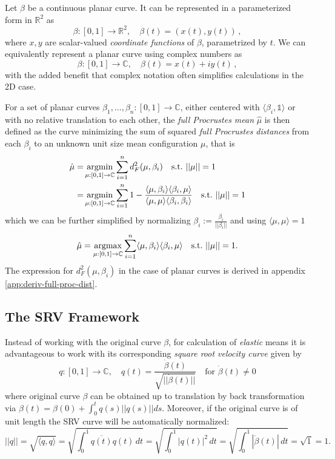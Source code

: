 Let $\beta$ be a continuous planar curve.
It can be represented in a parameterized form in $\mathbb{R}^2$ as
$$ \beta : [0,1] \rightarrow \mathbb{R}^2,\quad \beta(t) = ( x(t), y(t)) \,, $$
where $x, y$ are scalar-valued \textit{coordinate functions} of $\beta$, parametrized by $t$.
We can equivalently represent a planar curve using complex numbers as
$$ \beta : [0,1] \rightarrow \mathbb{C},\quad \beta(t) = x(t) + iy(t) \,, $$
with the added benefit that complex notation often simplifies calculations in the 2D case.

For a set of planar curves $\beta_1,\dots,\beta_n : [0,1] \rightarrow \mathbb{C}$, either centered with $\langle \beta_i, \mathbb{1} \rangle$ or with no relative translation to each other, the \textit{full Procrustes mean} $\hat{\mu}$ is then defined as the curve minimizing the sum of squared \textit{full Procrustes distances} from each $\beta_i$ to an unknown unit size mean configuration $\mu$, that is
\begin{align*}
    \hat{\mu} =& \operatorname*{argmin}_{\mu:[0,1]\rightarrow\mathbb{C}} \sum_{i=1}^n d^2_F(\mu,\beta_i)
    \quad\text{s.t.}\,\, ||\mu|| = 1 \\
    =& \operatorname*{argmin}_{\mu:[0,1]\rightarrow\mathbb{C}} \sum_{i=1}^n 1 - \frac{\langle \mu, \beta_i \rangle \langle \beta_i, \mu \rangle}{\langle \mu, \mu \rangle \langle \beta_i, \beta_i \rangle}
    \quad\text{s.t.}\,\, ||\mu|| = 1
\end{align*}
which we can be further simplified by normalizing $\beta_i := \frac{\beta_i}{|| \beta_i ||}$ and using $\langle \mu, \mu \rangle = 1$
$$ \hat{\mu} = \operatorname*{argmax}_{\mu:[0,1]\rightarrow\mathbb{C}} \sum_{i=1}^n \langle \mu, \beta_i \rangle \langle \beta_i, \mu \rangle \quad\text{s.t.}\,\, ||\mu|| = 1. $$
The expression for $d^2_F(\mu,\beta_i)$ in the case of planar curves is derived in appendix \ref{app:deriv-full-proc-dist}.


\subsection{The SRV Framework}
Instead of working with the original curve $\beta$, for calculation of \textit{elastic} means it is advantageous to work with its corresponding \textit{square root velocity curve} given by
$$ q : [0, 1] \rightarrow \mathbb{C}, \quad q(t) = \frac{\dot{\beta}(t)}{\sqrt{|| \dot{\beta}(t) ||}} \quad \text{for} \,\, \dot{\beta}(t) \neq 0 $$
where original curve $\beta$ can be obtained up to translation by back transformation via $\beta(t) = \beta(0) + \int_0^t q(s) || q(s) || ds$.
Moreover, if the original curve is of unit length the SRV curve will be automatically normalized:
$$ ||q|| = \sqrt{\langle q, q \rangle} = \sqrt{ \int_0^1 \overline{q(t)} q(t) \, dt } = \sqrt{ \int_0^1 |q(t)|^2 \, dt} = \sqrt{\int_0^1 |\dot{\beta}(t)| \, dt} = \sqrt{1} = 1. $$



